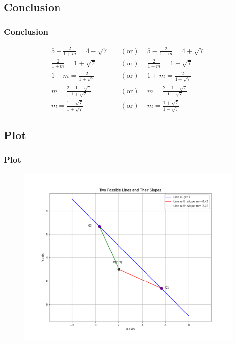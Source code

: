 \documentclass{beamer}
\providecommand{\brak}[1]{\ensuremath{\left(#1\right)}}
\theoremstyle{remark}
\numberwithin{equation}{section}
\begin{document}
\subsection{Conclusion}
\begin{frame}
\frametitle{Conclusion}
\begin{align}
5-\frac{2}{1+m}= 4-\sqrt{7}\quad &\brak{\text{or}}\ \quad  5-\frac{2}{1+m}=4+\sqrt{7} \\
\frac{2}{1+m} = 1+\sqrt{7}\quad &\brak{\text{or}}\ \quad \frac{2}{1+m} =1-\sqrt{7} \\
1+m = \frac{2}{1+\sqrt{7}}\quad &\brak{\text{or}}\ \quad 1+m = \frac{2}{1-\sqrt{7}}  \\
m=\frac{2-1-\sqrt{7}}{1+\sqrt{7}}\quad &\brak{\text{or}}\ \quad m = \frac{2-1+\sqrt{7}}{1-\sqrt{7}}  \\
m=\frac{1-\sqrt{7}}{1+\sqrt{7}} \quad &\brak{\text{or}}\ \quad m=\frac{1+\sqrt{7}}{1-\sqrt{7}}
\end{align}
\end{frame}
\subsection{Plot}
\begin{frame}[fragile]
\frametitle{Plot}

\begin{figure}[h!]
   \centering
   \includegraphics[width=0.7\columnwidth]{figs/fig1.png}
	\caption{}
   \label{}
\end{figure}
\end{frame}
\end{document}
